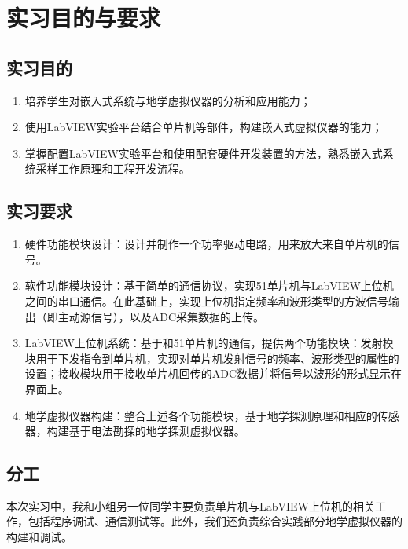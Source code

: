 \documentclass[UTF8]{article}
\begin{document}
\begin{titlepage}

\end{titlepage}

\tableofcontents
\cleardoublepage


%
\section{实习目的与要求}
\subsection{实习目的}
\begin{enumerate}
	\item 培养学生对嵌入式系统与地学虚拟仪器的分析和应用能力；
	\item 使用LabVIEW实验平台结合单片机等部件，构建嵌入式虚拟仪器的能力；
	\item 掌握配置LabVIEW实验平台和使用配套硬件开发装置的方法，熟悉嵌入式系统采样工作原理和工程开发流程。
\end{enumerate}



\subsection{实习要求}
\begin{enumerate}
	\item 硬件功能模块设计：设计并制作一个功率驱动电路，用来放大来自单片机的信号。
	\item 软件功能模块设计：基于简单的通信协议，实现51单片机与LabVIEW上位机之间的串口通信。在此基础上，实现上位机指定频率和波形类型的方波信号输出（即主动源信号），以及ADC采集数据的上传。
	\item LabVIEW上位机系统：基于和51单片机的通信，提供两个功能模块：发射模块用于下发指令到单片机，实现对单片机发射信号的频率、波形类型的属性的设置；接收模块用于接收单片机回传的ADC数据并将信号以波形的形式显示在界面上。
	\item 地学虚拟仪器构建：整合上述各个功能模块，基于地学探测原理和相应的传感器，构建基于电法勘探的地学探测虚拟仪器。
\end{enumerate}

\subsection{分工}
本次实习中，我和小组另一位同学主要负责单片机与LabVIEW上位机的相关工作，包括程序调试、通信测试等。此外，我们还负责综合实践部分地学虚拟仪器的构建和调试。
\end{document}
